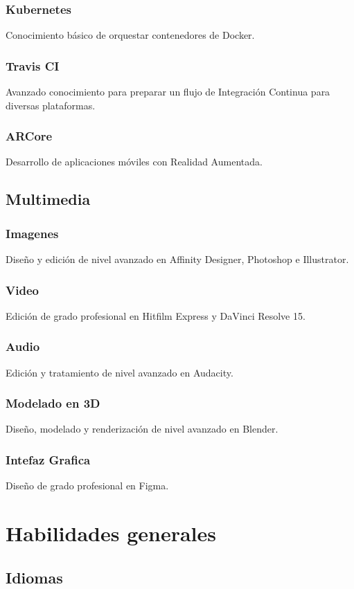 \documentclass{article}
\begin{document}
    \subsubsection{Kubernetes} Conocimiento básico de orquestar contenedores de Docker.
    \subsubsection{Travis CI} Avanzado conocimiento para preparar un flujo de Integración Continua para diversas plataformas.
    \subsubsection{ARCore} Desarrollo de aplicaciones móviles con Realidad Aumentada.
    \subsection{Multimedia}
    \subsubsection{Imagenes}
    Diseño y edición de nivel avanzado en Affinity Designer, Photoshop e Illustrator.
    \subsubsection{Video}
    Edición de grado profesional en Hitfilm Express y DaVinci Resolve 15.
    \subsubsection{Audio}
    Edición y tratamiento de nivel avanzado en Audacity.
    \subsubsection{Modelado en 3D}
    Diseño, modelado y renderización de nivel avanzado en Blender.
    \subsubsection{Intefaz Grafica}
    Diseño de grado profesional en Figma.
    \section{Habilidades generales}
    \subsection{Idiomas}
\end{document}

